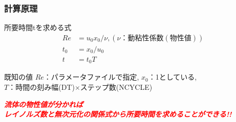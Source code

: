 \documentclass[unicode, 9pt, aspectratio=169]{beamer}
\begin{document}
\begin{frame}
  \frametitle{計算原理}
  \centering
  \begin{minipage}{.8\linewidth}
    \vspace{-8truemm}
    \begin{block}{所要時間tを求める式}
      \vspace{-5truemm}
      \begin{align}
        Re &= u_0x_0/\nu, (\nu ：動粘性係数(物性値))\\
        t_0 &= x_0/u_0 \\
        t &= t_0T
      \end{align}
    \end{block}
    \begin{exampleblock}{既知の値}
      \centering
      $Re$：パラメータファイルで指定, $x_0$：1としている, \\$T$：時間の刻み幅(DT)$\times$ステップ数(NCYCLE)
    \end{exampleblock}
    \begin{alertblock}{}
      \centering
      \Large \emph{\textbf{\textcolor{red}{流体の物性値が分かれば\\レイノルズ数と無次元化の関係式から所要時間を求めることができる!!}}}
    \end{alertblock}
  \end{minipage}
\end{frame}
\end{document}
